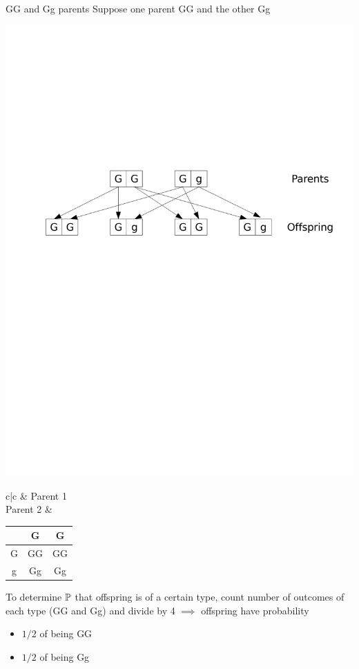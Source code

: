 \documentclass[aspectratio=43]{beamer}
\begin{document}
\begin{frame}{GG and Gg parents}
Suppose one parent GG and the other Gg
\vfill
\begin{center}
	\includegraphics[width=\textwidth]{FIGS_slides/dominant_hybrid}
\end{center}
\begin{center}
\begin{tabular}{c|c}
& Parent 1 \\ 
\hline
Parent 2 &
\begin{tabular}{c|cc}
& G & G \\
\hline
G & GG & GG \\
g & Gg & Gg
\end{tabular}
\end{tabular}
\end{center}
To determine $\mathbb{P}$ that offspring is of a certain type, count number of outcomes of each type (GG and Gg) and divide by 4
\vfill
$\implies$ offspring have probability
\begin{itemize}
\item $1/2$ of being GG
\item $1/2$ of being Gg
\end{itemize}
\end{frame}
\end{document}
